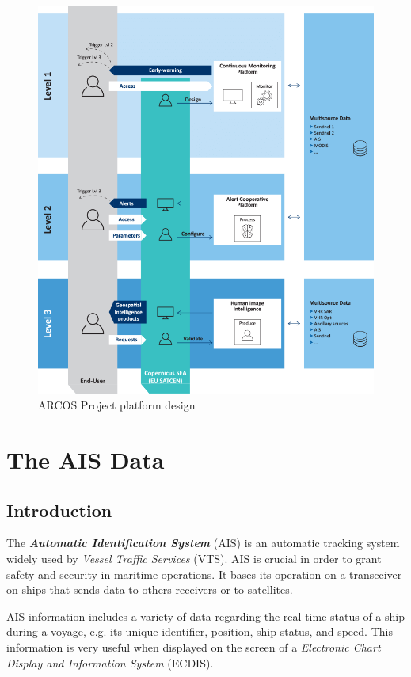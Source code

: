     \begin{figure}[H]
        \centering
        \includegraphics[width=13cm]{Images/1/arcos-design.png}
        \caption{ARCOS Project platform design \cite{arcos}}
    \end{figure}
        

    
\newpage
\section{The AIS Data}
    \subsection{Introduction}
    The \textit{\textbf{Automatic Identification System}} (AIS) is an automatic tracking system widely used by \textit{Vessel Traffic Services} (VTS). AIS is crucial in order to grant safety and security in maritime operations.
    It bases its operation on a transceiver on ships that sends data to others receivers or to satellites.
    
    AIS information includes a variety of data regarding the real-time status of a ship during a voyage, e.g. its unique identifier, position, ship status, and speed. This information is very useful when displayed on the screen of a \textit{Electronic Chart Display and Information System} (ECDIS).
    
